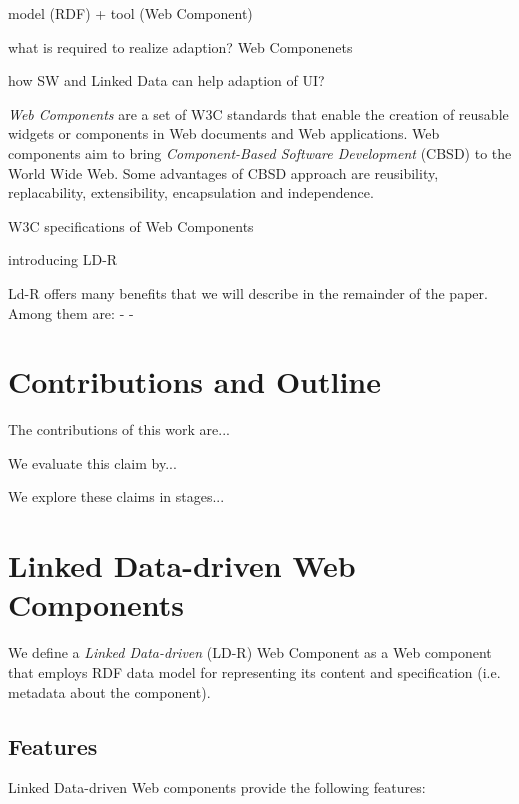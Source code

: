 \documentclass{acm_proc_article-sp}
\begin{document}
model (RDF) + tool (Web Component)

what is required to realize adaption? Web Componenets

how SW and Linked Data can help adaption of UI?


\emph{Web Components} are a set of W3C standards that enable the creation of reusable widgets or components in Web documents and Web applications.
Web components aim to bring \emph{Component-Based Software Development} (CBSD) to the World Wide Web.
Some advantages of CBSD approach are reusibility, replacability, extensibility, encapsulation and independence.

W3C specifications of Web Components \cite{webcomponentsW3C}

introducing LD-R


Ld-R offers many benefits that we will describe in the remainder of the paper. Among them are:
-
-
\section{Contributions and Outline}
The contributions of this work are...

We evaluate this claim by...

We explore these claims in stages...


\section{Linked Data-driven Web Components}

We define a \emph{Linked Data-driven} (LD-R) Web Component as a Web component that employs RDF data model for representing its content and specification (i.e. metadata about the component).

\subsection{Features}

Linked Data-driven Web components provide the following features:
\end{document}
